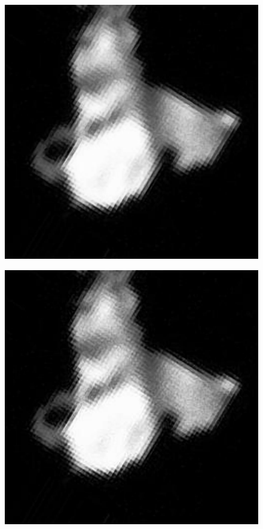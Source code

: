\begin{figure}[h!]
	\centering
	\begin{minipage}{.5\textwidth}
		\centering
		\includegraphics[width=0.8\linewidth]{inc/img/us_espcn_x4}
		\label{fig:us_espcn_x4}
	\end{minipage}%
	\begin{minipage}{.5\textwidth}
		\centering
		\includegraphics[width=0.8\linewidth]{inc/img/us_esdr_x4}
		\label{fig:us_esdr_x4}
	\end{minipage}
\end{figure}

